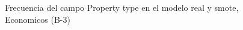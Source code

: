 \begin{figure}[H]
    \centering
    
    \caption{Frecuencia del campo Property type en el modelo real y smote, Economicos (B-3)}
    \label{frecuency-Property Type-smote-enc}
\end{figure}
